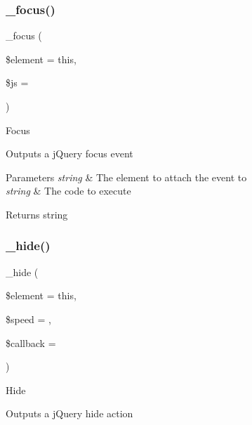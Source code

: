\subsubsection{\texorpdfstring{\+\_\+focus()}{\_focus()}}
{\footnotesize\ttfamily \+\_\+focus (\begin{DoxyParamCaption}\item[{}]{\$element = {\ttfamily \textquotesingle{}this\textquotesingle{}},  }\item[{}]{\$js = {\ttfamily \textquotesingle{}\textquotesingle{}} }\end{DoxyParamCaption})\hspace{0.3cm}{\ttfamily [protected]}}

Focus

Outputs a j\+Query focus event


\begin{DoxyParams}{Parameters}
{\em string} & The element to attach the event to \\
\hline
{\em string} & The code to execute \\
\hline
\end{DoxyParams}
\begin{DoxyReturn}{Returns}
string 
\end{DoxyReturn}
\mbox{\label{class_c_i___jquery_a11a78a5297f13443708684ef7858a49c}} 
\subsubsection{\texorpdfstring{\+\_\+hide()}{\_hide()}}
{\footnotesize\ttfamily \+\_\+hide (\begin{DoxyParamCaption}\item[{}]{\$element = {\ttfamily \textquotesingle{}this\textquotesingle{}},  }\item[{}]{\$speed = {\ttfamily \textquotesingle{}\textquotesingle{}},  }\item[{}]{\$callback = {\ttfamily \textquotesingle{}\textquotesingle{}} }\end{DoxyParamCaption})\hspace{0.3cm}{\ttfamily [protected]}}

Hide

Outputs a j\+Query hide action



